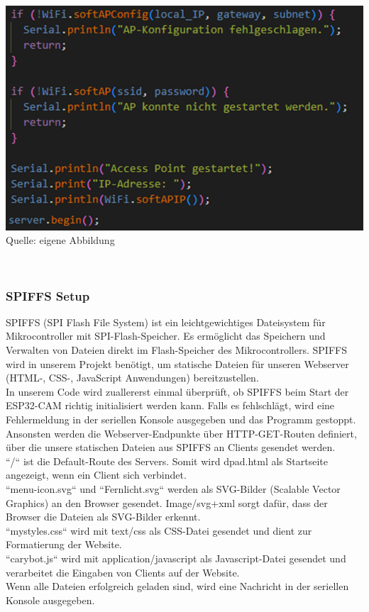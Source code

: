\documentclass[ngerman,12pt,a4paper]{article}
\begin{document}
	\begin{minipage}{\textwidth}
		\centering
		\includegraphics[scale=0.7]{Pictures/server-setup}
		\label{fig:server-setup}
		\vspace{-2pt}
		\small Quelle: eigene Abbildung
	\end{minipage} \\[0.5cm]
			
			\subsubsection{SPIFFS Setup}
			
	SPIFFS (SPI Flash File System) ist ein leichtgewichtiges Dateisystem für Mikrocontroller mit SPI-Flash-Speicher. Es ermöglicht das Speichern und Verwalten von Dateien direkt im Flash-Speicher des Mikrocontrollers. SPIFFS wird in unserem Projekt benötigt, um statische Dateien für unseren Webserver (HTML-, CSS-, JavaScript Anwendungen) bereitzustellen. \\[0.5cm] 
	In unserem Code wird zuallererst einmal überprüft, ob SPIFFS beim Start der ESP32-CAM richtig initialisiert werden kann. Falls es fehlschlägt, wird eine Fehlermeldung in der seriellen Konsole ausgegeben und das Programm gestoppt. Ansonsten werden die Webserver-Endpunkte über HTTP-GET-Routen definiert, über die unsere statischen Dateien aus SPIFFS an Clients gesendet werden. \\[0.5cm] 
	“/“ ist die Default-Route des Servers. Somit wird dpad.html als Startseite angezeigt, wenn ein Client sich verbindet. \\[0.5cm] 
	“menu-icon.svg“ und “Fernlicht.svg“ werden als SVG-Bilder (Scalable Vector Graphics) an den Browser gesendet. Image/svg+xml sorgt dafür, dass der Browser die Dateien als SVG-Bilder erkennt. \\[0.5cm] 
	“mystyles.css“ wird mit text/css als CSS-Datei gesendet und dient zur Formatierung der Website. \\[0.5cm] 
	“carybot.js“ wird mit application/javascript als Javascript-Datei gesendet und verarbeitet die Eingaben von Clients auf der Website. \\[0.5cm] 
	Wenn alle Dateien erfolgreich geladen sind, wird eine Nachricht in der seriellen Konsole ausgegeben. \\
	
\end{document}
